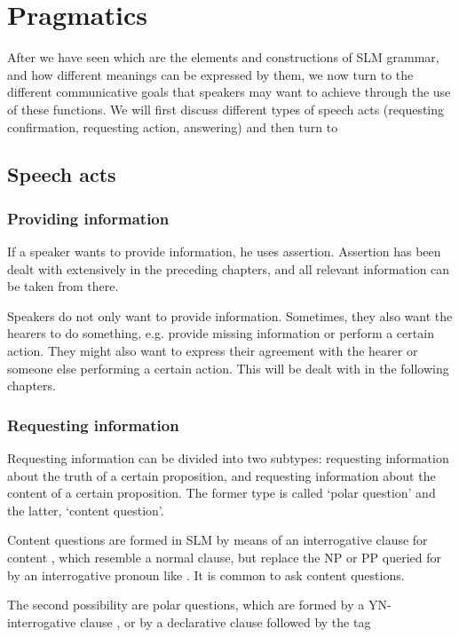 \chapter{Pragmatics}\label{sec:func:Pragmatics}
After we have seen which are the elements and constructions of SLM grammar, and how different meanings can be expressed by them, we now turn to the different communicative goals that speakers may want to achieve through the use of these functions. We will first discuss different types of speech acts (requesting confirmation, requesting action, answering) and then turn to 

\section{Speech acts}\label{sec:pragm:Speechacts}


\subsection{Providing information}\label{sec:pragm:Providinginformation}
If a speaker wants to provide information, he uses assertion.
Assertion has been dealt with extensively in the preceding chapters, and all relevant information can be taken from there.

Speakers do not only want to provide information. Sometimes, they also want the hearers to do something, e.g. provide missing information or perform a certain action. They might also want to express their agreement with the hearer or someone else performing a certain action. This will be dealt with in the following chapters.

\subsection{Requesting information}\label{sec:pragm:Requestinginformation}
Requesting information can be divided into two subtypes: requesting information about the truth of a certain proposition, and requesting information about the content of a certain proposition. The former type is called `polar question' and the latter, `content question'.

Content questions are formed in SLM by means of an interrogative clause for content , which resemble a normal clause, but replace the NP or PP queried for by an interrogative pronoun like . It is common to ask content questions.

The second possibility are polar questions, which are formed by a YN-interrogative clause , or by a declarative clause followed by the tag 


